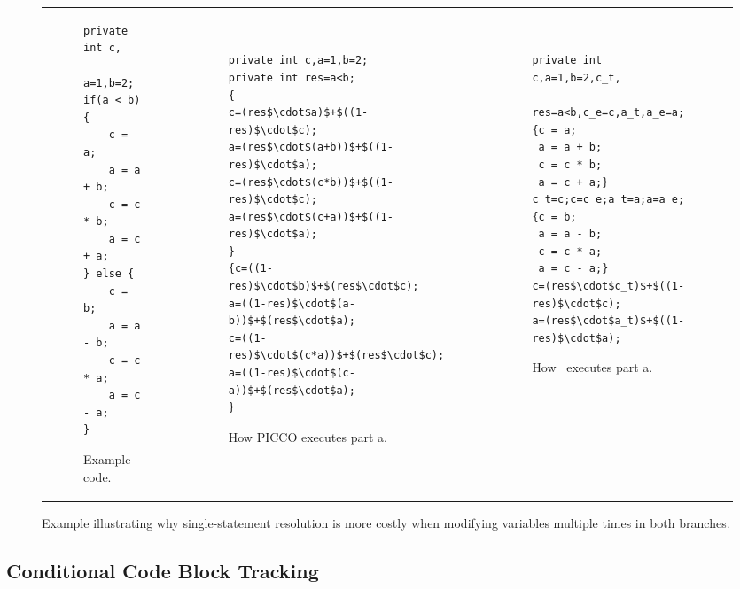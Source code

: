 \begin{figure*}\footnotesize
\hspace{0.3cm} \begin{tabular}{l l l}
\begin{subfigure}{0.21\textwidth}
\begin{lstlisting}
private int c, 
		a=1,b=2;
if(a < b) {		
	c = a; 
	a = a + b;
	c = c * b; 
	a = c + a; 
} else {						
	c = b; 
	a = a - b;
	c = c * a; 
	a = c - a; 
}
\end{lstlisting}
\caption{Example code.}
\label{Fig: resolution cost ex code}
\end{subfigure} &
\-\ 
\begin{subfigure}{0.36\textwidth}
\begin{lstlisting}[emph={[2]res,c_e,c_t},emphstyle={[2]\color{blue}}]
private int c,a=1,b=2;
private int res=a<b;
{
c=(res$\cdot$a)$+$((1-res)$\cdot$c); 
a=(res$\cdot$(a+b))$+$((1-res)$\cdot$a);
c=(res$\cdot$(c*b))$+$((1-res)$\cdot$c); 
a=(res$\cdot$(c+a))$+$((1-res)$\cdot$a);	
}	
{c=((1-res)$\cdot$b)$+$(res$\cdot$c);
a=((1-res)$\cdot$(a-b))$+$(res$\cdot$a);
c=((1-res)$\cdot$(c*a))$+$(res$\cdot$c);
a=((1-res)$\cdot$(c-a))$+$(res$\cdot$a);
}
\end{lstlisting}
\caption{How PICCO executes part a.}
\label{Fig: resolution cost ex PICCO}
\end{subfigure} &
\-\ 
\begin{subfigure}{0.37\textwidth}
\begin{lstlisting}[emph={[2]res,c_e,c_t,a_e,a_t},emphstyle={[2]\color{blue}}]
private int c,a=1,b=2,c_t,
	res=a<b,c_e=c,a_t,a_e=a; 
{c = a; 
 a = a + b;
 c = c * b; 
 a = c + a;}
c_t=c;c=c_e;a_t=a;a=a_e;
{c = b; 
 a = a - b;
 c = c * a; 
 a = c - a;}
c=(res$\cdot$c_t)$+$((1-res)$\cdot$c); 
a=(res$\cdot$a_t)$+$((1-res)$\cdot$a); 
\end{lstlisting}
\caption{How \piccoC\ executes part a.}
\label{Fig: resolution cost ex \piccoC}
\end{subfigure}
\end{tabular}
\caption{Example illustrating why single-statement resolution is more costly when modifying variables multiple times in both branches.}
\label{Fig: resolution cost ex}
\end{figure*}


\subsection{Conditional Code Block Tracking}


